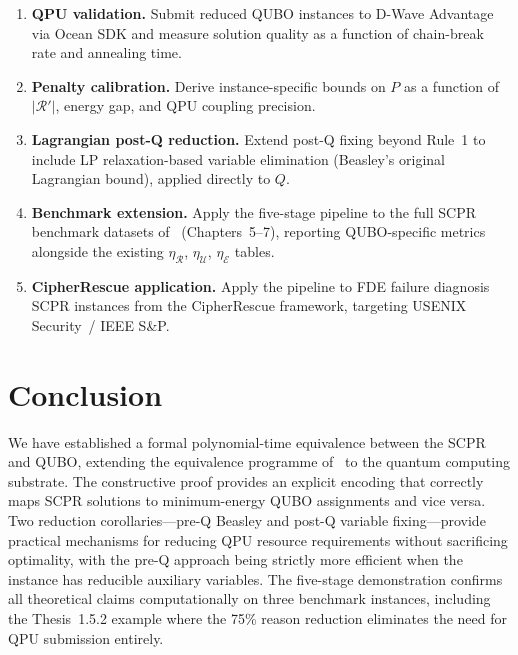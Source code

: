 \documentclass[11pt,a4paper]{article}
\theoremstyle{plain}
\theoremstyle{definition}
\theoremstyle{remark}
\newcommand{\R}{\mathcal{R}}
\newcommand{\SCPR}{\textup{SCPR}}
\newcommand{\QUBO}{\textup{QUBO}}
\newcommand{\abs}[1]{\lvert #1 \rvert}
\newcommand{\etaR}{\eta_{\mathcal{R}}}
\newcommand{\etaU}{\eta_{\mathcal{U}}}
\newcommand{\etaE}{\eta_{\mathcal{E}}}
\begin{document}
\begin{enumerate}[leftmargin=*, label=\arabic*.]
  \item \textbf{QPU validation.} Submit reduced \QUBO{} instances to D-Wave
        Advantage via Ocean SDK and measure solution quality as a function of
        chain-break rate and annealing time.

  \item \textbf{Penalty calibration.} Derive instance-specific bounds on $P$
        as a function of $\abs{\R'}$, energy gap, and QPU coupling precision.

  \item \textbf{Lagrangian post-Q reduction.} Extend post-Q fixing beyond
        Rule~1 to include LP relaxation-based variable elimination
        (Beasley's original Lagrangian bound), applied directly to $Q$.

  \item \textbf{Benchmark extension.} Apply the five-stage pipeline to the
        full \SCPR{} benchmark datasets of~\cite{babatunde2025thesis}
        (Chapters~5--7), reporting QUBO-specific metrics alongside the existing
        $\etaR$, $\etaU$, $\etaE$ tables.

  \item \textbf{CipherRescue application.} Apply the pipeline to FDE failure
        diagnosis \SCPR{} instances from the CipherRescue framework,
        targeting USENIX Security~/ IEEE S\&P.
\end{enumerate}

\section{Conclusion}
\label{sec:conclusion}

We have established a formal polynomial-time equivalence between the \SCPR{} and
\QUBO{}, extending the equivalence programme of~\cite{babatunde2025thesis} to the
quantum computing substrate.
The constructive proof provides an explicit encoding that correctly maps \SCPR{}
solutions to minimum-energy \QUBO{} assignments and vice versa.
Two reduction corollaries---pre-Q Beasley and post-Q variable fixing---provide
practical mechanisms for reducing QPU resource requirements without sacrificing
optimality, with the pre-Q approach being strictly more efficient when the instance
has reducible auxiliary variables.
The five-stage demonstration confirms all theoretical claims computationally on
three benchmark instances, including the Thesis~1.5.2 example where the 75\%
reason reduction eliminates the need for QPU submission entirely.
\end{document}
